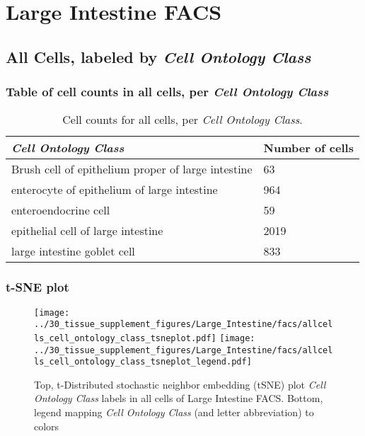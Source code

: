 \clearpage
\section{Large Intestine FACS}

\subsection{All Cells, labeled by \emph{Cell Ontology Class}}
\subsubsection{Table of cell counts in all cells, per \emph{Cell Ontology Class}}\begin{table}[h]
\centering
\label{my-label}
\begin{tabular}{@{}ll@{}}
\toprule

\emph{Cell Ontology Class}& Number of cells \\ \midrule
Brush cell of epithelium proper of large intestine & 63 \\

enterocyte of epithelium of large intestine & 964 \\

enteroendocrine cell & 59 \\

epithelial cell of large intestine & 2019 \\

large intestine goblet cell & 833 \\
\bottomrule
\end{tabular}
\caption{Cell counts for all cells, per \emph{Cell Ontology Class}.}
\end{table}

\clearpage
\subsubsection{t-SNE plot}
\begin{figure}[h]
\centering
\texttt{[image: ../30\_tissue\_supplement\_figures/Large\_Intestine/facs/allcells\_cell\_ontology\_class\_tsneplot.pdf]}
\texttt{[image: ../30\_tissue\_supplement\_figures/Large\_Intestine/facs/allcells\_cell\_ontology\_class\_tsneplot\_legend.pdf]}
\caption{Top, t-Distributed stochastic neighbor embedding (tSNE) plot  \emph{Cell Ontology Class} labels in all cells of Large Intestine FACS. Bottom, legend mapping \emph{Cell Ontology Class} (and letter abbreviation) to colors}
\end{figure}


